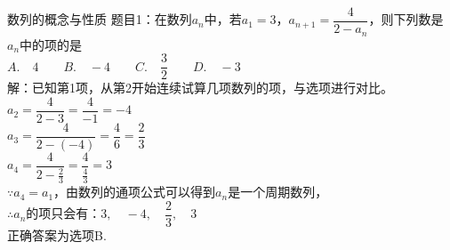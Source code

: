 \documentclass[aspectratio=169]{ctexbeamer} %
\date{\today}
\begin{document}
\begin{frame}{数列的概念与性质}
题目1：在数列${a_n}$中，若$a_1 = 3$，$a_{n+1} = \dfrac{4}{2-a_n}$，则下列数是$a_n$中的项的是 \\
$A. \quad 4 \qquad B. \quad -4 \qquad C. \quad \dfrac{3}{2} \qquad D. \quad -3$ \\
\pause
解：已知第1项，从第2开始连续试算几项数列的项，与选项进行对比。\\
\pause
$a_2 = \dfrac{4}{2-3} = \dfrac{4}{-1} = -4$ \\
\pause
$a_3 = \dfrac{4}{2-(-4)} = \dfrac{4}{6} = \dfrac{2}{3}$ \\
\pause
$a_4 = \dfrac{4}{2-\frac{2}{3}} = \dfrac{4}{\frac{4}{3}} = 3$ \\
\pause
$\because a_4 = a_1$，由数列的通项公式可以得到${a_n}$是一个周期数列，\\
\pause
$\therefore {a_n}$的项只会有：$3, \quad -4, \quad \dfrac{2}{3}, \quad 3$ \\
\pause
正确答案为选项B.
\end{frame}
\end{document}
